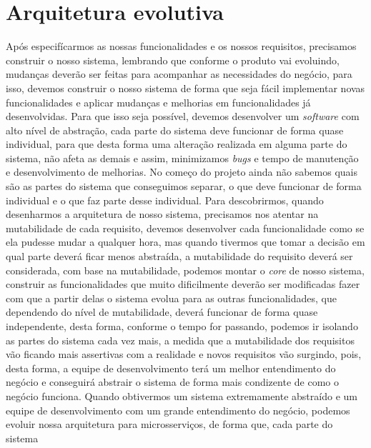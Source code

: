     \section{Arquitetura evolutiva}
      Após especifícarmos as nossas funcionalidades e os nossos requisitos, precisamos
      construir o nosso sistema, lembrando que conforme o produto vai evoluindo,
      mudanças deverão ser feitas para acompanhar as necessidades do negócio, para
      isso, devemos construir o nosso sistema de forma que seja fácil implementar novas
      funcionalidades e aplicar mudanças e melhorias em funcionalidades já desenvolvidas.
      Para que isso seja possível, devemos desenvolver um \textit{software} com alto
      nível de abstração, cada parte do sistema deve funcionar de forma quase
      individual, para que desta forma uma alteração realizada em alguma parte do
      sistema, não afeta as demais e assim, minimizamos \textit{bugs} e tempo de
      manutenção e desenvolvimento de melhorias. \newline
      No começo do projeto ainda não sabemos quais são as partes do sistema que
      conseguimos separar, o que deve funcionar de forma individual e o que faz
      parte desse individual. Para descobrirmos, quando desenharmos a arquitetura
      de nosso sistema, precisamos nos atentar na mutabilidade de cada requisito,
      devemos desenvolver cada funcionalidade como se ela pudesse mudar a qualquer
      hora, mas quando tivermos que tomar a decisão em qual parte deverá ficar menos
      abstraída, a mutabilidade do requisito deverá ser considerada, com base na
      mutabilidade, podemos montar o \textit{core} de nosso sistema, construir
      as funcionalidades que muito dificilmente deverão ser modificadas fazer com
      que a partir delas o sistema evolua para as outras funcionalidades, que
      dependendo do nível de mutabilidade, deverá funcionar de forma quase independente,
      desta forma, conforme o tempo for passando, podemos ir isolando as partes
      do sistema cada vez mais, a medida que a mutabilidade dos requisitos vão
      ficando mais assertivas com a realidade e novos requisitos vão surgindo, pois,
      desta forma, a equipe de desenvolvimento terá um melhor entendimento do negócio
      e conseguirá abstrair o sistema de forma mais condizente de como o negócio
      funciona. Quando obtivermos um sistema extremamente abstraído e um equipe
      de desenvolvimento com um grande entendimento do negócio, podemos evoluir
      nossa arquitetura para microsserviços, de forma que, cada parte do sistema
